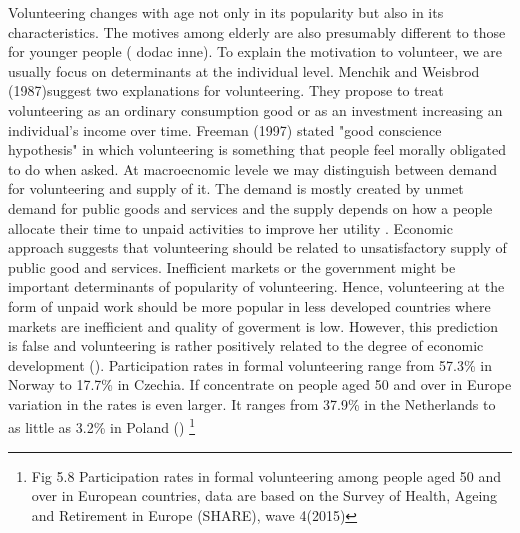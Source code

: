 \documentclass[10pt, letterpaper]{article}
\newcommand{\emd}[1]{\ExecuteMetaData[/tmp/tex]{#1}} %
\begin{document}
\begin{spacing}{1.4} %






Volunteering changes with age not only in its popularity but also in its characteristics. The motives among elderly are also presumably different to those for younger people (\citet{wilson12} dodac inne). To explain the motivation to volunteer, we are usually focus on determinants at the individual level. Menchik and Weisbrod (1987)suggest two explanations for volunteering. They propose to treat volunteering as an ordinary consumption good or as  an investment increasing an individual's income over time. Freeman (1997) stated "good conscience hypothesis" in which volunteering is something that people feel morally obligated to do when asked. At macroecnomic levele we may distinguish  between demand for volunteering and supply of it. The demand is mostly created by unmet demand for public goods and services and the supply depends on how  a people allocate their time to unpaid activities to improve her utility \citet{ziemek06}. Economic approach   suggests that volunteering should be related to unsatisfactory supply of public good and services. Inefficient markets or the government might be important determinants of popularity of volunteering. Hence, volunteering at the form of unpaid work should be more popular in less developed countries where markets are inefficient and quality of goverment is low. However, this prediction is false and volunteering is rather positively  related to the degree of economic development (\citet{Oecd15}). Participation rates in formal volunteering range from 57.3\% in Norway to 17.7\% in Czechia. If concentrate on people aged 50 and over in Europe variation in the rates is even larger. It ranges from 37.9\% in the Netherlands to as little as 3.2\% in Poland (\citet{Oecd15}) \footnote{Fig 5.8 Participation rates in formal volunteering among people aged 50 and over in European countries, data are based on the Survey of Health, Ageing and Retirement in Europe (SHARE), wave 4(2015)} \\ 


\end{spacing}
\end{document}
